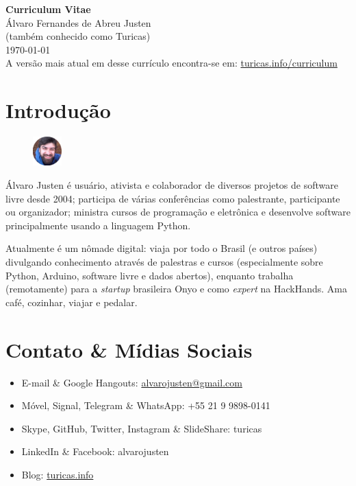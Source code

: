 \documentclass[a4paper,11pt]{article}
\begin{document}
\pagestyle{empty}

\begin{center}
 \huge{\textbf{Curriculum Vitae}}
 \\
 \huge{Álvaro Fernandes de Abreu Justen}
 \\
 \small{(também conhecido como Turicas)}
 \large{\\}
 \large{\today}
 \\
 \small{A versão mais atual em desse currículo encontra-se em:
        \href{http://turicas.info/curriculum}{turicas.info/curriculum}}
\end{center}

\newcommand{\titulo}[1]{\section*{#1}}
\renewcommand{\labelitemi}{$\diamond$}
\renewcommand{\labelitemii}{$\rightarrow$}

\titulo{Introdução}
\begin{figure}
	\begin{center}
		\includegraphics[width=0.1\textwidth]{turicas}
	\end{center}
\end{figure}

Álvaro Justen é usuário, ativista e colaborador de diversos projetos de
software livre desde 2004; participa de várias conferências como palestrante,
participante ou organizador; ministra cursos de programação e eletrônica e
desenvolve software principalmente usando a linguagem Python.

Atualmente é um nômade digital: viaja por todo o Brasil (e outros países)
divulgando conhecimento através de palestras e cursos (especialmente sobre
Python, Arduino, software livre e dados abertos), enquanto trabalha
(remotamente) para a \textit{startup} brasileira Onyo e como \textit{expert} na
HackHands. Ama café, cozinhar, viajar e pedalar.

\titulo{Contato \& Mídias Sociais}
	\begin{itemize}
		\renewcommand{\labelitemi}{}
		\item E-mail \& Google Hangouts: \url{alvarojusten@gmail.com}
		\item Móvel, Signal, Telegram \& WhatsApp: +55 21 9 9898-0141
		\item Skype, GitHub, Twitter, Instagram \& SlideShare: turicas
		\item LinkedIn \& Facebook: alvarojusten
		\item Blog: \href{http://turicas.info/}{turicas.info}
	\end{itemize}
\end{document}
